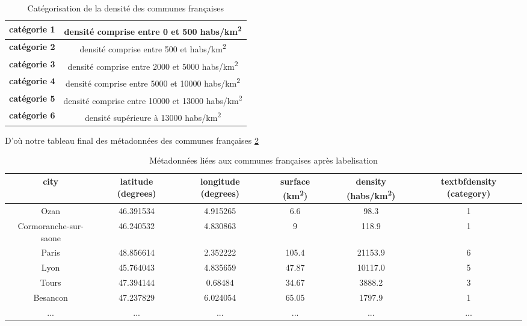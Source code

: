\documentclass{book}
\begin{document}
\begin{table}[H]
\begin{center}
\begin{adjustbox}{max width=\textwidth}
{
\begin{tabular}{|c|c|}
    \hline 
    \textbf{catégorie 1} & densité comprise entre 0 et 500 habs/km\textsuperscript{2}\\
    \hline
    \textbf{catégorie 2} & densité comprise entre 500 et habs/km\textsuperscript{2}\\
    \hline
    \textbf{catégorie 3} & densité comprise entre 2000 et 5000 habs/km\textsuperscript{2}\\
    \hline
    \textbf{catégorie 4} & densité comprise entre 5000 et 10000 habs/km\textsuperscript{2}\\
    \hline
    \textbf{catégorie 5} & densité comprise entre 10000 et 13000 habs/km\textsuperscript{2}\\
    \hline
    \textbf{catégorie 6} & densité supérieure à 13000 habs/km\textsuperscript{2}\\
    \hline
\end{tabular}
}
\end{adjustbox}
\end{center}
\caption{Catégorisation de la densité des communes françaises}
\label{tab_meta_categorie}
\end{table}

D'où notre tableau final des métadonnées des communes françaises \ref{tab_meta_cat}

\begin{table}[H]
\begin{center}
\begin{adjustbox}{max width=\textwidth}
{
\begin{tabular}{|c|c|c|c|c|c|}
\hline 
city & latitude (degrees) & longitude (degrees) & surface (km\textsuperscript{2}) & density (habs/km\textsuperscript{2}) & textbf{density (category)}\\
\hline
Ozan & 46.391534 & 4.915265 & 6.6 & 98.3 & 1\\
\hline 
Cormoranche-sur-saone & 46.240532 & 4.830863 & 9 & 118.9 & 1\\
\hline 
Paris & 48.856614 & 2.352222 & 105.4 & 21153.9 & 6\\
\hline
Lyon & 45.764043 & 4.835659 & 47.87 & 10117.0 & 5\\
\hline
Tours & 47.394144 & 0.68484 & 34.67 & 3888.2 & 3\\
\hline
Besancon & 47.237829 & 6.024054 & 65.05 & 1797.9 & 1\\
\hline 
... & ... & ... & ... & ... & ...\\
\hline
\end{tabular}
}
\end{adjustbox}
\end{center}
\caption{Métadonnées liées aux communes françaises après labelisation}
\label{tab_meta_cat}
\end{table}
\end{document}
